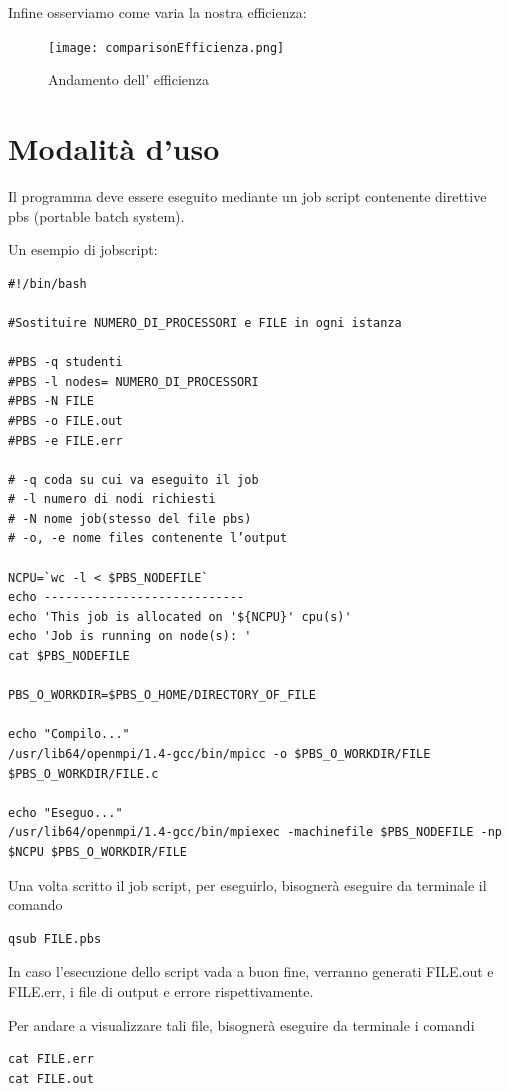 \documentclass{article}
\begin{document}
Infine osserviamo come varia la nostra efficienza:
\begin{figure}[h!tbp]
    \centering
    \texttt{[image: comparisonEfficienza.png]}
    \caption{Andamento dell' efficienza}
    \label{fig:enter-label}
\end{figure}

\section{Modalità d'uso}
Il programma deve essere eseguito mediante un job script contenente direttive pbs (portable batch system).

Un esempio di jobscript:
\begin{lstlisting}
#!/bin/bash

#Sostituire NUMERO_DI_PROCESSORI e FILE in ogni istanza

#PBS -q studenti
#PBS -l nodes= NUMERO_DI_PROCESSORI
#PBS -N FILE
#PBS -o FILE.out
#PBS -e FILE.err

# -q coda su cui va eseguito il job
# -l numero di nodi richiesti
# -N nome job(stesso del file pbs)
# -o, -e nome files contenente l’output

NCPU=`wc -l < $PBS_NODEFILE`
echo ----------------------------
echo 'This job is allocated on '${NCPU}' cpu(s)'
echo 'Job is running on node(s): '
cat $PBS_NODEFILE

PBS_O_WORKDIR=$PBS_O_HOME/DIRECTORY_OF_FILE

echo "Compilo..."
/usr/lib64/openmpi/1.4-gcc/bin/mpicc -o $PBS_O_WORKDIR/FILE $PBS_O_WORKDIR/FILE.c

echo "Eseguo..."
/usr/lib64/openmpi/1.4-gcc/bin/mpiexec -machinefile $PBS_NODEFILE -np $NCPU $PBS_O_WORKDIR/FILE
\end{lstlisting}

Una volta scritto il job script, per eseguirlo, bisognerà eseguire da terminale il comando 
\begin{lstlisting}
qsub FILE.pbs
\end{lstlisting}

In caso l'esecuzione dello script vada a buon fine, verranno generati FILE.out e FILE.err, i file di output e errore rispettivamente.

Per andare a visualizzare tali file, bisognerà eseguire da terminale i comandi
\begin{lstlisting}
cat FILE.err
cat FILE.out
\end{lstlisting}
\end{document}
